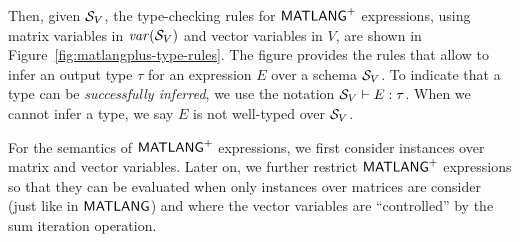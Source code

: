 Then, given $\mathcal{S}_V$, the type-checking rules for $\mathsf{MATLANG}^{\sf +}$ expressions, using matrix variables in $\operatorname{\mathit{var}}(\mathcal{S}_V)$ and vector variables in $V$,
are shown in Figure~\ref{fig:matlangplus-type-rules}.  The figure provides the rules
that allow to infer an output type $\tau$ for an expression $E$
over a schema $\mathcal{S}_V$. 
 To indicate that a type can be
\emph{successfully inferred}, we use the notation
$\mathcal{S}_V\vdash E:\tau$.  When we cannot infer a type, we say $E$
is not well-typed over $\mathcal{S}_V$.  


%

For the semantics of $\mathsf{MATLANG}^{\sf +}$ expressions, we first consider instances over matrix and vector variables. Later on, we further restrict
$\mathsf{MATLANG}^{\sf +}$ expressions so that they can be evaluated when only instances over matrices are consider (just like in $\mathsf{MATLANG}$) and where
the vector variables are ``controlled'' by the sum iteration operation.

